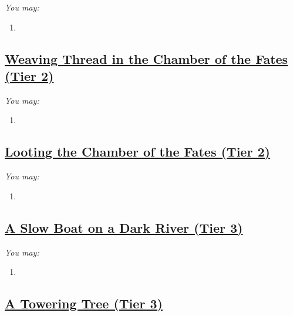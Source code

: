 \documentclass[sheet]{GL2020}
\begin{document}
\begingroup
\itshape
You may:
\begin{enumerate}[A]
  \item 
\end{enumerate}
\endgroup

\clearpage


\begin{center}\section*{\underline{Weaving Thread in the Chamber of the Fates (Tier 2)}}\end{center}
\label{WeavingThreadChamberofFates}

\begingroup
\itshape
You may:
\begin{enumerate}[A]
  \item 
\end{enumerate}
\endgroup

\clearpage

\begin{center}\section*{\underline{Looting the Chamber of the Fates (Tier 2)}}\end{center}
\label{LootingChamberofFates}

\begingroup
\itshape
You may:
\begin{enumerate}[A]
  \item 
\end{enumerate}
\endgroup

\clearpage

\begin{center}\section*{\underline{A Slow Boat on a Dark River (Tier 3)}}\end{center}
\label{SlowBoatDarkRiver}

\begingroup
\itshape
You may:
\begin{enumerate}[A]
  \item 
\end{enumerate}
\endgroup

\clearpage

\begin{center}\section*{\underline{A Towering Tree (Tier 3)}}\end{center}
\label{ToweringTree}
\end{document}
